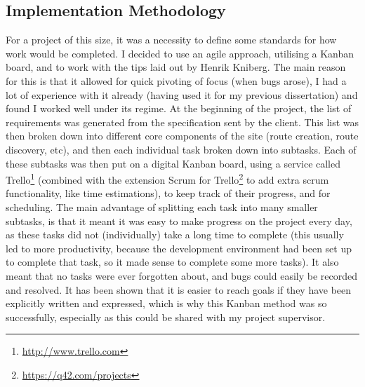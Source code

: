 \subsection{Implementation Methodology}
For a project of this size, it was a necessity to define some standards for how work would be completed. I decided to use an agile approach, utilising a Kanban board, and to work with the tips laid out by Henrik Kniberg\cite{kniberg2007scrum}. The main reason for this is that it allowed for quick pivoting of focus (when bugs arose), I had a lot of experience with it already (having used it for my previous dissertation) and found I worked well under its regime. At the beginning of the project, the list of requirements was generated from the specification sent by the client. This list was then broken down into different core components of the site (route creation, route discovery, etc), and then each individual task broken down into subtasks. Each of these subtasks was then put on a digital Kanban board, using a service called Trello\footnote{\url{http://www.trello.com}} (combined with the extension Scrum for Trello\footnote{\url{https://q42.com/projects}} to add extra scrum functionality, like time estimations), to keep track of their progress, and for scheduling. The main advantage of splitting each task into many smaller subtasks, is that it meant it was easy to make progress on the project every day, as these tasks did not (individually) take a long time to complete (this usually led to more productivity, because the development environment had been set up to complete that task, so it made sense to complete some more tasks). It also meant that no tasks were ever forgotten about, and bugs could easily be recorded and resolved. It has been shown that it is easier to reach goals if they have been explicitly written and expressed\cite{wilson2008goal}, which is why this Kanban method was so successfully, especially as this could be shared with my project supervisor.

